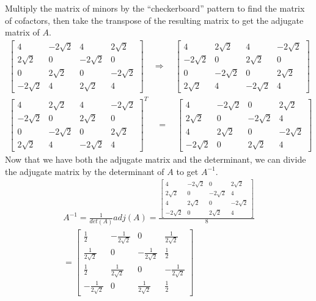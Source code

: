 \documentclass{article}
\theoremstyle{definition}
\begin{document}
Multiply the matrix of minors by the ``checkerboard'' pattern to find the matrix of cofactors, then
take the transpose of the resulting matrix to get the adjugate matrix of $A$.
\[
\begin{gathered}
\begin{bmatrix}
    4 & -2\sqrt{2} & 4 & 2\sqrt{2}\\
    2\sqrt{2} & 0 & -2\sqrt{2} & 0\\
    0 & 2\sqrt{2} & 0 & -2\sqrt{2}\\
    -2\sqrt{2} & 4 & 2\sqrt{2} & 4
\end{bmatrix} \quad \Longrightarrow \quad \begin{bmatrix}
    4 & 2\sqrt{2} & 4 & -2\sqrt{2}\\
    -2\sqrt{2} & 0 & 2\sqrt{2} & 0\\
    0 & -2\sqrt{2} & 0 & 2\sqrt{2}\\
    2\sqrt{2} & 4 & -2\sqrt{2} & 4
\end{bmatrix}\\
\begin{bmatrix}
    4 & 2\sqrt{2} & 4 & -2\sqrt{2}\\
    -2\sqrt{2} & 0 & 2\sqrt{2} & 0\\
    0 & -2\sqrt{2} & 0 & 2\sqrt{2}\\
    2\sqrt{2} & 4 & -2\sqrt{2} & 4
\end{bmatrix}^T \quad = \quad \begin{bmatrix}
    4 & -2\sqrt{2} & 0 & 2\sqrt{2}\\
    2\sqrt{2} & 0 & -2\sqrt{2} & 4\\
    4 & 2\sqrt{2} & 0 & -2\sqrt{2}\\
    -2\sqrt{2} & 0 & 2\sqrt{2} & 4
\end{bmatrix}
\end{gathered}
\] 
Now that we have both the adjugate matrix and the determinant, we can divide the adjugate matrix
by the determinant of $A$ to get $A^{-1}$.
\[
\begin{gathered}
    A^{-1} = \frac{1}{det(A)}adj(A) = \frac{\begin{bmatrix}
        4 & -2\sqrt{2} & 0 & 2\sqrt{2}\\
        2\sqrt{2} & 0 & -2\sqrt{2} & 4\\
        4 & 2\sqrt{2} & 0 & -2\sqrt{2}\\
        -2\sqrt{2} & 0 & 2\sqrt{2} & 4
    \end{bmatrix}}{8}\\
    =\begin{bmatrix}
        \frac{1}{2} & -\frac{1}{2\sqrt{2}} & 0 & \frac{1}{2\sqrt{2}}\\
        \frac{1}{2\sqrt{2}} & 0 & -\frac{1}{2\sqrt{2}} & \frac{1}{2}\\
        \frac{1}{2} & \frac{1}{2\sqrt{2}} & 0 & -\frac{1}{2\sqrt{2}}\\
        -\frac{1}{2\sqrt{2}} & 0 & \frac{1}{2\sqrt{2}} & \frac{1}{2}
    \end{bmatrix}
\end{gathered}
\]
\end{document}
